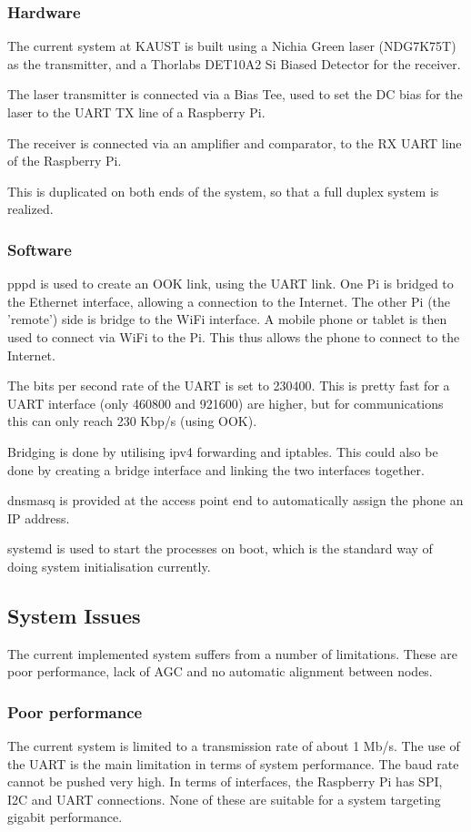 \subsubsection{Hardware}
The current system at \ac{KAUST} is built using a Nichia Green laser (NDG7K75T)
as the transmitter, and a Thorlabs DET10A2 Si Biased Detector for the receiver.

The laser transmitter is connected via a Bias Tee, used to set the DC bias
for the laser to the \ac{UART} TX line of a Raspberry Pi.

The receiver is connected via an amplifier and comparator, to the RX UART
line of the Raspberry Pi.

This is duplicated on both ends of the system, so that a full duplex
system is realized.

\subsubsection{Software}
pppd is used to create an OOK link, using the \ac{UART} link. One Pi is
bridged to the Ethernet interface, allowing a connection to the Internet.
The other Pi (the 'remote') side is bridge to the WiFi interface. A mobile
phone or tablet is then used to connect via WiFi to the Pi. This thus allows
the phone to connect to the Internet.

The bits per second rate of the \ac{UART} is set to 230400. This is pretty fast
for a \ac{UART} interface (only 460800 and 921600) are higher, but for
communications this can only reach 230 Kbp/s (using \ac{OOK}).

Bridging is done by utilising ipv4 forwarding and iptables. This could also
be done by creating a bridge interface and linking the two interfaces together.

dnsmasq is provided at the access point end to automatically assign the phone
an IP address.

systemd is used to start the processes on boot, which is the standard way
of doing system initialisation currently.

\subsection{System Issues}
The current implemented system suffers from a number of limitations. These are
poor performance, lack of \ac{AGC} and no automatic alignment between nodes.

\subsubsection{Poor performance}
The current system is limited to a transmission rate of about 1 Mb/s. The use
of the \ac{UART} is the main limitation in terms of system performance. The baud
rate cannot be pushed very high. In terms of interfaces, the Raspberry Pi has
\ac{SPI}, \ac{I2C} and \ac{UART} connections. None of these are suitable for
a system targeting gigabit performance.

